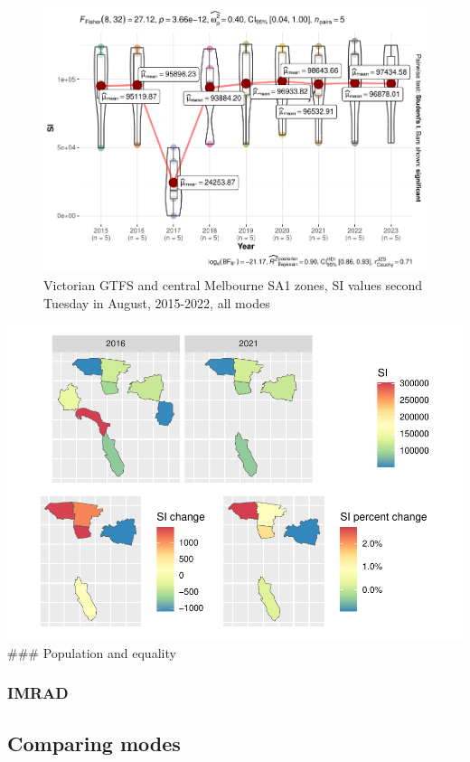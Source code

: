 \documentclass[preprint, 3p,
authoryear]{elsarticle} %
\begin{document}
\begin{figure}
\centering
\includegraphics{Leveraging_GTFS_to_assess_transit_supply_Transport_Geography_files/figure-latex/Victoria_within_stats_yearly-1.pdf}
\caption{Victorian GTFS and central Melbourne SA1 zones, SI values
second Tuesday in August, 2015-2022, all modes}
\end{figure}

\includegraphics{Leveraging_GTFS_to_assess_transit_supply_Transport_Geography_files/figure-latex/Greater_Melbourne_map-1.pdf}
\#\#\# Population and equality

\hypertarget{imrad}{%
\subsubsection{IMRAD}\label{imrad}}

\hypertarget{comparing-modes}{%
\subsection{Comparing modes}\label{comparing-modes}}
\end{document}
